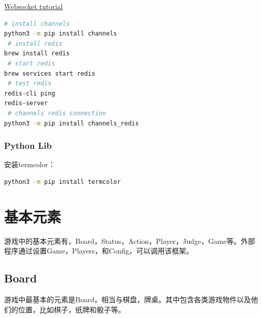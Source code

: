 \documentclass[export, 12pt, letterpaper]{ctexrep}
\begin{document}
\href{https://www.youtube.com/watch?v=RVH05S1qab8\&list=PLcWimtlf9naWeyuY5OwQeaRNxvxTRyTCt\&index=1\&t=3148s}{Websocket tutorial}

\begin{lstlisting}[language=Bash]
 # install channels
python3 -m pip install channels
 # install redis
brew install redis
 # start redis
brew services start redis
 # test redis
redis-cli ping
redis-server
 # channels redis connection
python3 -m pip install channels_redis
\end{lstlisting}

\subsection{Python Lib}

安装termcolor：

\begin{lstlisting}[language=Bash]
python3 -m pip install termcolor
\end{lstlisting}

\chapter{基本元素}


游戏中的基本元素有，Board，Status，Action，Player，Judge，Game等。外部程序通过设置Game，Players，和Config，可以调用该框架。

\section{Board}

游戏中最基本的元素是Board，相当与棋盘，牌桌。其中包含各类游戏物件以及他们的位置，比如棋子，纸牌和骰子等。
\end{document}
